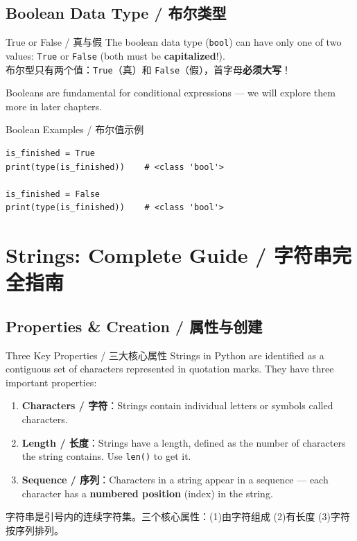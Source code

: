 \documentclass[11pt,a4paper]{report}
\let\oldtexttt\texttt
\renewcommand{\texttt}[1]{\textcolor{mainblue}{\oldtexttt{#1}}}
\begin{document}
\subsection{Boolean Data Type / 布尔类型}

\begin{concept}{True or False / 真与假}
    The boolean data type (\texttt{bool}) can have only one of two values: \texttt{True} or \texttt{False} (both must be \textbf{capitalized}!). \\
    布尔型只有两个值：\texttt{True}（真）和 \texttt{False}（假），首字母\textbf{必须大写}！

    Booleans are fundamental for conditional expressions — we will explore them more in later chapters.
\end{concept}

\begin{examplebox}{Boolean Examples / 布尔值示例}
\begin{lstlisting}
is_finished = True
print(type(is_finished))    # <class 'bool'>

is_finished = False
print(type(is_finished))    # <class 'bool'>
\end{lstlisting}
\end{examplebox}

\section{Strings: Complete Guide / 字符串完全指南}

\subsection{Properties \& Creation / 属性与创建}

\begin{concept}{Three Key Properties / 三大核心属性}
    Strings in Python are identified as a contiguous set of characters represented in quotation marks. They have three important properties:
    \begin{enumerate}[itemsep=0.3em]
        \item \textbf{Characters / 字符}：Strings contain individual letters or symbols called characters.
        \item \textbf{Length / 长度}：Strings have a length, defined as the number of characters the string contains. Use \texttt{len()} to get it.
        \item \textbf{Sequence / 序列}：Characters in a string appear in a sequence — each character has a \textbf{numbered position} (index) in the string.
    \end{enumerate}
    字符串是引号内的连续字符集。三个核心属性：(1)由字符组成 (2)有长度 (3)字符按序列排列。
\end{concept}
\end{document}
